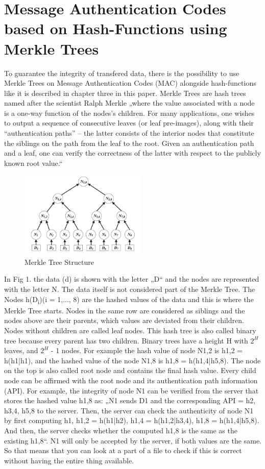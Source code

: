 \section{Message Authentication Codes based on Hash-Functions using Merkle Trees}

To guarantee the integrity of transfered data, there is the possibility to use Merkle Trees on Message Authentication Codes (MAC) alongside hash-functions like it is described in chapter three in this paper. Merkle Trees are hash trees named after the scientist Ralph Merkle „where the value associated with a node is a one-way function of the nodes’s children. For many applications, one wishes to output a sequence of consecutive leaves (or leaf pre-images), along with their “authentication paths” – the latter consists of the interior nodes that constitute the siblings on the path from the leaf to the root. Given an authentication path and a leaf, one can verify the correctness of the latter with respect to the publicly known root value.“ \cite{MT} 

\begin{figure}
\centering
\includegraphics[width=6cm]{Pages/Merkle/merkleTree.png}
\caption{Merkle Tree Structure}
\end{figure}

In Fig 1. the data (d) is shown with the letter „D“ and the nodes are represented with the letter N. The data itself is not considered part of the Merkle Tree. The Nodes h(D\textsubscript{i})(i = 1,..., 8) are the hashed values of the data and this is where the Merkle Tree starts. Nodes in the same row are considered as siblings and the nodes above are their parents, which values are deviated from their children. Nodes without children are called leaf nodes. This hash tree is also called binary tree because every parent has two children. Binary trees have a height H with $ 2^{H} $ leaves, and $  2^{H} $ - 1 nodes. \cite{MT} 
For example the hash value of node N1,2 is h1,2 = h(h1|h1), and the hashed value of the node N1,8 is h1,8 = h(h1,4|h5,8). \cite{METR} The node on the top is also called root node and contains the final hash value. Every child node can be affirmed with the root node and its authentication path information (API). For example, the integrity of node N1 can be verified from the server that stores the hashed value h1,8 as: „N1 sends D1 and the corresponding API = h2, h3,4, h5,8 to the server. Then, the server can check the authenticity of node N1 by first computing h1, h1,2 = h(h1|h2), h1,4 = h(h1,2|h3,4), h1,8 = h(h1,4|h5,8). And then, the server checks whether the computed h1,8 is the same as the existing h1,8“. \cite{METR} N1 will only be accepted by the server, if both values are the same. So that means that you can look at a part of a file to check if this is correct without having the entire thing available.

